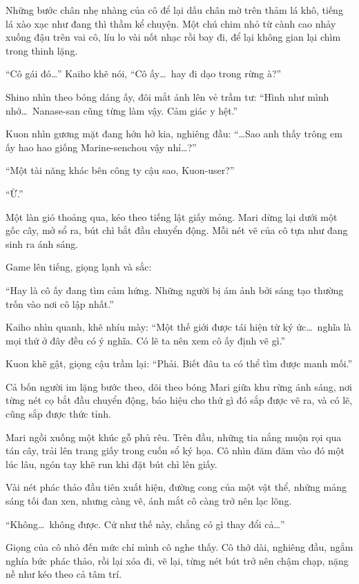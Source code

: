 \documentclass[../main.tex]{subfiles}
\begin{document}
Những bước chân nhẹ nhàng của cô để lại dấu chân mờ trên thảm lá khô, tiếng lá xào xạc như đang thì thầm kể chuyện. Một chú chim nhỏ từ cành cao nhảy xuống đậu trên vai cô, líu lo vài nốt nhạc rồi bay đi, để lại không gian lại chìm trong thinh lặng.

``Cô gái đó\dots'' Kaiho khẽ nói, ``Cô ấy\dots\ hay đi dạo trong rừng à?''

Shino nhìn theo bóng dáng ấy, đôi mắt ánh lên vẻ trầm tư: ``Hình như mình nhớ\dots\ Nanase-san cũng từng làm vậy. Cảm giác y hệt.''

Kuon nhìn gương mặt đang hớn hở kia, nghiêng đầu: ``\dots Sao anh thấy trông em ấy hao hao giống Marine-senchou vậy nhỉ\dots?''

``Một tài năng khác bên công ty cậu sao, Kuon-user?''

``Ừ.''

Một làn gió thoảng qua, kéo theo tiếng lật giấy mỏng. Mari dừng lại dưới một gốc cây, mở sổ ra, bút chì bắt đầu chuyển động. Mỗi nét vẽ của cô tựa như đang sinh ra ánh sáng.

Game lên tiếng, giọng lạnh và sắc:

``Hay là cô ấy đang tìm cảm hứng. Những người bị ám ảnh bởi sáng tạo thường trốn vào nơi cô lập nhất.''

Kaiho nhìn quanh, khẽ nhíu mày: ``Một thế giới được tái hiện từ ký ức\dots\ nghĩa là mọi thứ ở đây đều có ý nghĩa. Có lẽ ta nên xem cô ấy định vẽ gì.''

Kuon khẽ gật, giọng cậu trầm lại: ``Phải. Biết đâu ta có thể tìm được manh mối.''

Cả bốn người im lặng bước theo, dõi theo bóng Mari giữa khu rừng ánh sáng, nơi từng nét cọ bắt đầu chuyển động, báo hiệu cho thứ gì đó sắp được vẽ ra, và có lẽ, cũng sắp được thức tỉnh.

\ct

Mari ngồi xuống một khúc gỗ phủ rêu. Trên đầu, những tia nắng muộn rọi qua tán cây, trải lên trang giấy trong cuốn sổ ký họa. Cô nhìn đăm đăm vào đó một lúc lâu, ngón tay khẽ run khi đặt bút chì lên giấy.

Vài nét phác thảo đầu tiên xuất hiện, đường cong của một vật thể, những mảng sáng tối đan xen, nhưng càng vẽ, ánh mắt cô càng trở nên lạc lõng.

``Không\dots\ không được. Cứ như thế này, chẳng có gì thay đổi cả\dots''

Giọng của cô nhỏ đến mức chỉ mình cô nghe thấy. Cô thở dài, nghiêng đầu, ngắm nghía bức phác thảo, rồi lại xóa đi, vẽ lại, từng nét bút trở nên chậm chạp, nặng nề như kéo theo cả tâm trí.
\end{document}
